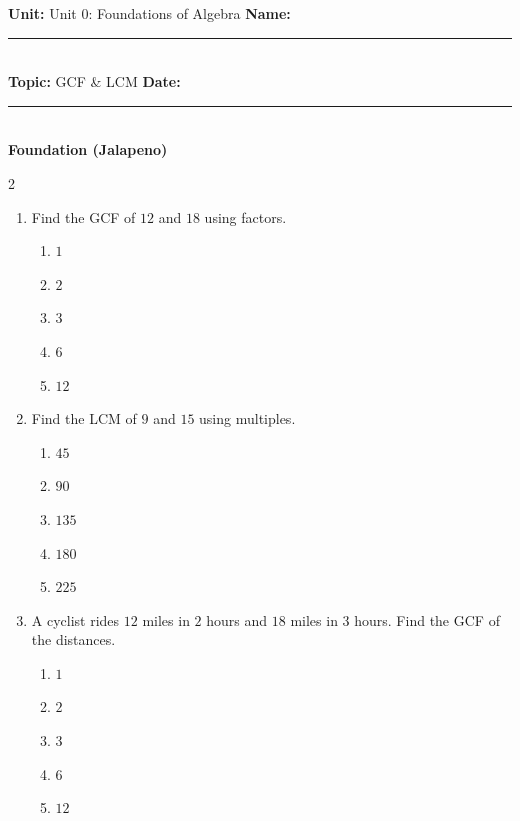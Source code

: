 \documentclass[10pt]{article}
\begin{document}
\enlargethispage{2.5cm}

\begin{tcolorbox}[colback=mainblue!5, colframe=mainblue, sharp corners, boxrule=0.5pt]
    \small \textbf{Unit:} Unit 0: Foundations of Algebra \hfill \textbf{Name:} \rule{3cm}{0.4pt} \\
    \small \textbf{Topic:} GCF & LCM \hfill \textbf{Date:} \rule{2cm}{0.4pt} \\
    \centering \textbf{\large Foundation (Jalapeno)}
\end{tcolorbox}

\vspace{0.2cm}

\begin{multicols}{2}
\begin{enumerate}[label=\textbf{Q\arabic*.}, leftmargin=*, itemsep=6pt, parsep=0pt]

  \item \small Find the GCF of $12$ and $18$ using factors.
  \begin{enumerate}[label=(\Alph*), leftmargin=0.6cm, nosep, itemsep=2pt]
    \item $1$
    \item $2$
    \item $3$
    \item $6$
    \item $12$
  \end{enumerate}

  \item \small Find the LCM of $9$ and $15$ using multiples.
  \begin{enumerate}[label=(\Alph*), leftmargin=0.6cm, nosep, itemsep=2pt]
    \item $45$
    \item $90$
    \item $135$
    \item $180$
    \item $225$
  \end{enumerate}

  \item \small A cyclist rides $12$ miles in $2$ hours and $18$ miles in $3$ hours. Find the GCF of the distances.
  \begin{enumerate}[label=(\Alph*), leftmargin=0.6cm, nosep, itemsep=2pt]
    \item $1$
    \item $2$
    \item $3$
    \item $6$
    \item $12$
  \end{enumerate}


\end{enumerate}
\end{multicols}
\end{document}
